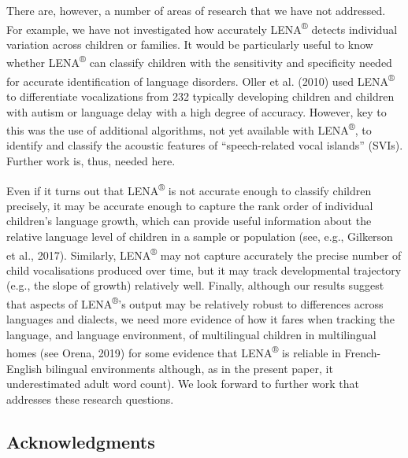 \documentclass[english,table,man,floatsintext]{apa6}
\begin{document}
There are, however, a number of areas of research that we have not addressed. For example, we have not investigated how accurately LENA\textsuperscript{®} detects individual variation across children or families. It would be particularly useful to know whether LENA\textsuperscript{®} can classify children with the sensitivity and specificity needed for accurate identification of language disorders. Oller et al. (2010) used LENA\textsuperscript{®} to differentiate vocalizations from 232 typically developing children and children with autism or language delay with a high degree of accuracy. However, key to this was the use of additional algorithms, not yet available with LENA\textsuperscript{®}, to identify and classify the acoustic features of \enquote{speech-related vocal islands} (SVIs). Further work is, thus, needed here.

Even if it turns out that LENA\textsuperscript{®} is not accurate enough to classify children precisely, it may be accurate enough to capture the rank order of individual children's language growth, which can provide useful information about the relative language level of children in a sample or population (see, e.g., Gilkerson et al., 2017). Similarly, LENA\textsuperscript{®} may not capture accurately the precise number of child vocalisations produced over time, but it may track developmental trajectory (e.g., the slope of growth) relatively well. Finally, although our results suggest that aspects of LENA\textsuperscript{®}'s output may be relatively robust to differences across languages and dialects, we need more evidence of how it fares when tracking the language, and language environment, of multilingual children in multilingual homes (see Orena, 2019) for some evidence that LENA\textsuperscript{®} is reliable in French-English bilingual environments although, as in the present paper, it underestimated adult word count). We look forward to further work that addresses these research questions.

\hypertarget{acknowledgments}{%
\subsection{Acknowledgments}\label{acknowledgments}}
\end{document}
